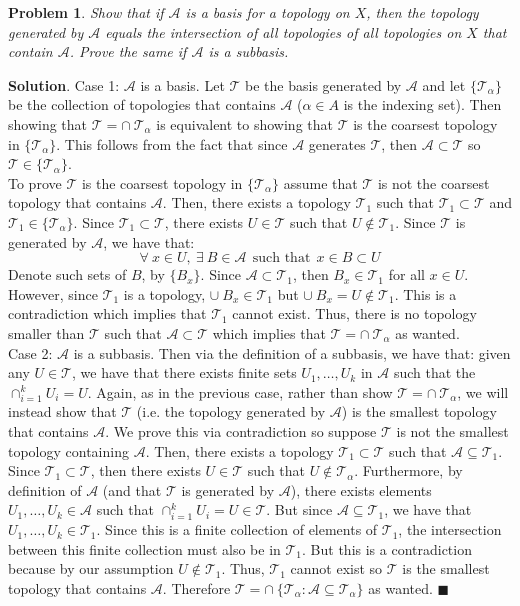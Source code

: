 \documentclass[12pt]{article}
\renewcommand{\=}[1]{\stackrel{#1}{=}} %
\providecommand{\T}{\mathcal{T}}
\newtheorem{p}{Problem}[section]
\theoremstyle{definition}
\newenvironment{s}{%
        \begin{trivlist} \item \textbf{Solution}. }{%
            \hspace*{\fill} $\blacksquare$\end{trivlist}}%
\begin{document}
\begin{p}
    Show that if $\mathcal{A}$ is a basis for a topology on $X$, then the topology generated by $\mathcal{A}$ equals the intersection
    of all topologies of all topologies on $X$ that contain $\mathcal{A}$. Prove the same if $\mathcal{A}$ is a subbasis.
\end{p}
\begin{s}
    Case 1: $\mathcal{A}$ is a basis. Let $\T$ be the basis generated by $\mathcal{A}$ and let $\{\T_{\alpha}\}$ be the collection
    of topologies that contains $\mathcal{A}$ ($\alpha\in A$ is the indexing set). Then showing that $\T = \cap\:\T_{\alpha}$ is
    equivalent to showing that $\T$ is the coarsest topology in $\{\T_{\alpha}\}$. This follows from the fact that since
    $\mathcal{A}$ generates $\T$, then $\mathcal{A}\subset\T$ so $\T\in\{\T_{\alpha}\}$. \\

    To prove $\T$ is the coarsest topology in $\{\T_{\alpha}\}$ assume that $\T$ is not the coarsest topology that contains $\mathcal{A}$. 
    Then, there exists a topology $\T_1$ such that
    $\T_1\subset\T$ and $\T_1\in\{\T_{\alpha}\}$. Since $\T_1\subset\T$, there exists $U\in\T$ such that $U\not\in\T_1$. Since
    $\T$ is generated by $\mathcal{A}$, we have that:
    \[ \forall\:x\in U,\:\exists\:B\in\mathcal{A}\:\:\text{such that}\:\:x\in B\subset U \]
    Denote such sets of $B$, by $\{B_x\}$. Since $\mathcal{A}\subset\T_1$, then $B_x\in\T_1$ for all $x\in U$. However,
    since $\T_1$ is a topology, $\cup\:B_x \in \T_1$ but $\cup\:B_x = U \not\in \T_1$. This is a contradiction which implies
    that $\T_1$ cannot exist. Thus, there is no topology smaller than $\T$ such that $\mathcal{A}\subset\T$ which implies that
    $\T = \cap\:\T_{\alpha}$ as wanted. \\

    Case 2: $\mathcal{A}$ is a subbasis. Then via the definition of a subbasis, we have that: given any $U\in\T$, we have 
    that there exists finite sets $U_1,\hdots,U_k$ in $\mathcal{A}$ such that the $\cap_{i=1}^k U_i = U$. Again, as in the previous
    case, rather than show $\T = \cap\:\T_{\alpha}$, we will instead show that $\T$ (i.e. the topology generated by $\mathcal{A}$) is
    the smallest topology that contains $\mathcal{A}$. We prove this via contradiction so suppose $\T$ is not the smallest topology containing $\mathcal{A}$. Then,
    there exists a topology $\T_1 \subset \T$ such that $\mathcal{A}\subseteq\T_1$. Since $\T_1\subset\T$, then there exists
    $U\in\T$ such that $U\not\in\T_{\alpha}$. Furthermore, by definition of $\mathcal{A}$ (and that $\T$ is generated by $\mathcal{A}$),
    there exists elements $U_1,\hdots,U_k\in\mathcal{A}$ such that $\cap_{i=1}^k U_i = U\in\T$. But since $\mathcal{A}\subseteq\T_1$, we
    have that $U_1,\hdots,U_k\in\T_1$. Since this is a finite collection of elements of $\T_1$, the intersection between this finite
    collection must also be in $\T_1$. But this is a contradiction because by our assumption $U\not\in\T_1$. Thus, $\T_1$ cannot exist
    so $\T$ is the smallest topology that contains $\mathcal{A}$. Therefore $\T = \cap\: \{\T_{\alpha}: \mathcal{A}\subseteq\T_{\alpha}\}$ as wanted.
\end{s}
\end{document}
